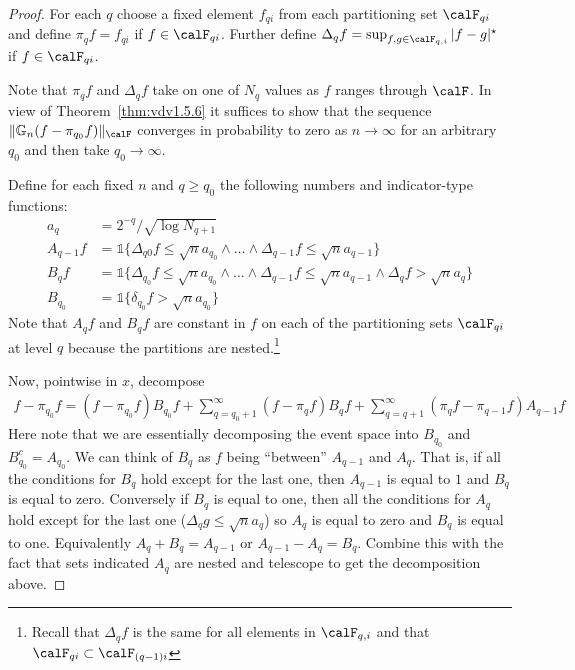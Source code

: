 \begin{proof}
	For each \(q\) choose a fixed element \(f_{qi}\) from each partitioning set \(\calF_{qi}\) and define \(\pi_qf = f_{qi}\) if \(f \in \calF_{qi}\). Further define \(\Delta_q f = \sup_{f,g\in\calF_{q,i}} |f-g|^\star\) if \(f\in\calF_{qi}\).

	Note that \(\pi_q f\) and \(\Delta_q f\) take on one of \(N_q\) values as \(f\) ranges through \(\calF\). In view of Theorem~\ref{thm:vdv1.5.6} it suffices to show that the sequence \(\|\mathbb{G}_n(f-\pi_{q_0}f)\|_\calF\) converges in probability to zero as \(n\to\infty\) for an arbitrary \(q_0\) and then take \(q_0 \to \infty\).

	Define for each fixed \(n\) and \(q \geq q_0\) the following numbers and indicator-type functions:
	\begin{align*}
		a_q &= 2^{-q}/\sqrt{\log N_{q+1}} \\
		A_{q-1}f &= \mathds{1}\{\Delta_{q0}f \leq \sqrt n a_{q_0} \wedge \dots\wedge \Delta_{q-1}f \leq \sqrt{n} a_{q-1}\}\\
		B_q f &= \mathds{1}\{\Delta_{q_0}f \leq \sqrt{n}a_{q_0}\wedge\dots\wedge \Delta_{q-1}f \leq \sqrt{n}a_{q-1}\wedge \Delta_q f > \sqrt{n} a_q \}\\
		B_{q_0} &= \mathds{1}\{\delta_{q_0}f > \sqrt{n}a_{q_0}\} 
	\end{align*}
	Note that \(A_qf\) and \(B_qf\) are constant in \(f\) on each of the partitioning sets \(\calF_{qi}\) at level \(q\) because the partitions are nested.\footnote{Recall that \(\Delta_q f\) is the same for all elements in \(\calF_{q,i}\) and that \(\calF_{qi} \subset \calF_{(q-1)i}\)}

	Now, pointwise in \(x\), decompose
	\begin{align}
		\label{eq:decomposition}
		\tag{B-1}
		f - \pi_{q_0}f = (f-\pi_{q_0}f)B_{q_0}f + \sum_{q= q_0+1}^\infty (f-\pi_qf)B_qf + \sum_{q=q+1}^\infty (\pi_qf-\pi_{q-1}f)A_{q-1}f  
	\end{align}
	Here note that we are essentially decomposing the event space into \(B_{q_0}\) and \(B_{q_0}^c = A_{q_0}\). We can think of \(B_q\) as \(f\) being ``between'' \(A_{q-1}\) and \(A_{q}\). That is, if all the conditions for \(B_q\) hold except for the last one, then \(A_{q-1}\) is equal to \(1\) and \(B_q\) is equal to zero. Conversely if \(B_q\) is equal to one, then all the conditions for \(A_q\) hold except for the last one (\(\Delta_q g \leq \sqrt{n} a_{q}\)) so \(A_q\) is equal to zero and \(B_q\) is equal to one. Equivalently \(A_{q} + B_q = A_{q-1}\) or \(A_{q-1} - A_{q} = B_q\). Combine this with the fact that sets indicated \(A_q\) are nested and telescope to get the decomposition above.  


\end{proof}
